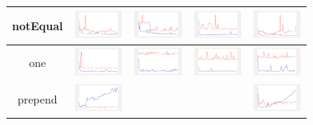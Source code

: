 \begin{longtable}{ c|c c c c}
notEqual
&
\includegraphics[width=1.6cm]{../graphs/sequence/small/NEQ}
&
\includegraphics[width=1.6cm]{../graphs/set/small/NEQ}
&
\includegraphics[width=1.6cm]{../graphs/bag/small/NEQ}
&
\includegraphics[width=1.6cm]{../graphs/orderedset/small/NEQ}
\\\hline

one
&
\includegraphics[width=1.6cm]{../graphs/sequence/small/One}
&
\includegraphics[width=1.6cm]{../graphs/set/small/One}
&
\includegraphics[width=1.6cm]{../graphs/bag/small/One}
&
\includegraphics[width=1.6cm]{../graphs/orderedset/small/One}
\\\hline

prepend
&
\includegraphics[width=1.6cm]{../graphs/sequence/small/Prepend}
&
&
&
\includegraphics[width=1.6cm]{../graphs/orderedset/small/Prepend}
\\\hline


\end{longtable}
